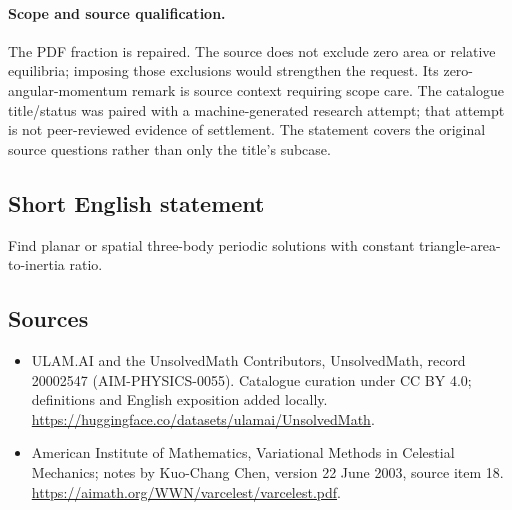\documentclass[11pt]{article}
\begin{document}
\paragraph{Scope and source qualification.}The PDF fraction is repaired. The source does not exclude zero area or relative equilibria; imposing those exclusions would strengthen the request. Its zero-angular-momentum remark is source context requiring scope care. The catalogue title/status was paired with a machine-generated research attempt; that attempt is not peer-reviewed evidence of settlement. The statement covers the original source questions rather than only the title’s subcase.
\subsection{Short English statement}
Find planar or spatial three-body periodic solutions with constant triangle-area-to-inertia ratio.
\subsection{Sources}
\begin{itemize}
\item[\hypertarget{source:20002547:1}{S1}] ULAM.AI and the UnsolvedMath Contributors, UnsolvedMath, record 20002547 (AIM-PHYSICS-0055). Catalogue curation under CC BY 4.0; definitions and English exposition added locally.
\url{https://huggingface.co/datasets/ulamai/UnsolvedMath}.
\item[\hypertarget{source:20002547:2}{S2}] American Institute of Mathematics, Variational Methods in Celestial Mechanics; notes by Kuo-Chang Chen, version 22 June 2003, source item 18.
\url{https://aimath.org/WWN/varcelest/varcelest.pdf}.
\end{itemize}
\label{end:20002547}
\end{document}
